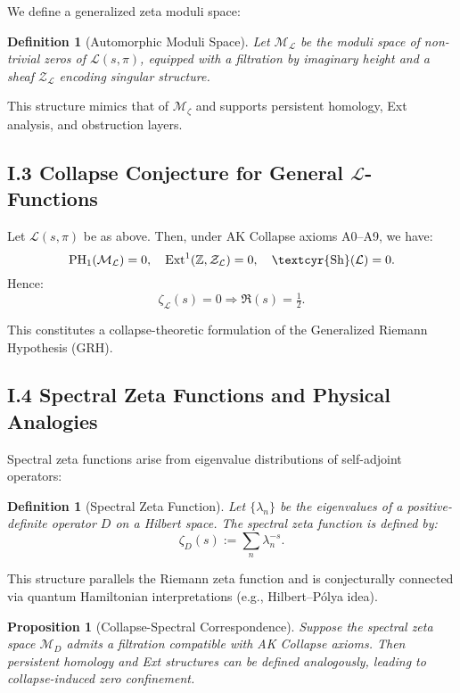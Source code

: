 \documentclass[11pt]{article}
\newtheorem{definition}[theorem]{Definition}
\newtheorem{proposition}[theorem]{Proposition}
\newcommand{\Sha}{\text{\textcyr{Sh}}}
\begin{document}
We define a generalized zeta moduli space:

\begin{definition}[Automorphic Moduli Space]
Let $\mathcal{M}_{\mathcal{L}}$ be the moduli space of non-trivial zeros of $\mathcal{L}(s, \pi)$,  
equipped with a filtration by imaginary height and a sheaf $\mathcal{Z}_{\mathcal{L}}$ encoding singular structure.
\end{definition}

This structure mimics that of $\mathcal{M}_\zeta$ and supports persistent homology, Ext analysis, and obstruction layers.

\subsection*{I.3 Collapse Conjecture for General $\mathcal{L}$-Functions}

\begin{conjecture}
Let $\mathcal{L}(s, \pi)$ be as above. Then, under AK Collapse axioms A0–A9, we have:
\[
\mathrm{PH}_1(\mathcal{M}_{\mathcal{L}}) = 0, \quad \mathrm{Ext}^1(\mathbb{Z}, \mathcal{Z}_{\mathcal{L}}) = 0, \quad \Sha(\mathcal{L}) = 0.
\]
Hence:
\[
\zeta_{\mathcal{L}}(s) = 0 \Rightarrow \Re(s) = \tfrac{1}{2}.
\]
\end{conjecture}

This constitutes a collapse-theoretic formulation of the Generalized Riemann Hypothesis (GRH).

\subsection*{I.4 Spectral Zeta Functions and Physical Analogies}

Spectral zeta functions arise from eigenvalue distributions of self-adjoint operators:

\begin{definition}[Spectral Zeta Function]
Let $\{\lambda_n\}$ be the eigenvalues of a positive-definite operator $D$ on a Hilbert space.  
The spectral zeta function is defined by:
\[
\zeta_D(s) := \sum_{n} \lambda_n^{-s}.
\]
\end{definition}

This structure parallels the Riemann zeta function and is conjecturally connected via quantum Hamiltonian interpretations (e.g., Hilbert–Pólya idea).

\begin{proposition}[Collapse-Spectral Correspondence]
Suppose the spectral zeta space $\mathcal{M}_D$ admits a filtration compatible with AK Collapse axioms.  
Then persistent homology and Ext structures can be defined analogously, leading to collapse-induced zero confinement.
\end{proposition}
\end{document}
